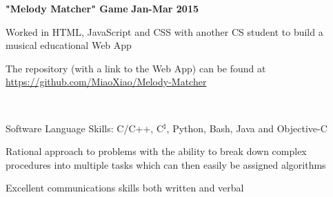 \documentclass[10pt]{article}
\newcommand{\thing}[1][]{\item #1}
\newcommand{\sectionheader}[1]{
    \vspace{3pt}
    \StrSplit{#1}{3}{\firstpart}{\lastpart} %
    \textbf{\LARGE
        \firstpart
        \lastpart
    }\\[5pt]
}
\newcommand{\dates}[2]{
    \textbf{#1-#2}
}
\begin{document}
    \textbf{\large "Melody Matcher" Game} \hfill \dates{Jan}{Mar 2015}
    \begin{things}
        \thing Worked in HTML, JavaScript and CSS with another
                CS student to build a musical educational Web App
        \thing The repository (with a link to the Web App) can be
                found at \url{https://github.com/MiaoXiao/Melody-Matcher}
    \end{things}

    \sectionheader{Skills}
    \vspace{-15pt} %
    \begin{things}
        \thing Software Language Skills: C/C++, C$^\sharp$, Python, Bash,
                Java and Objective-C
        \thing Rational approach to problems with the ability to
                break down complex procedures into multiple tasks
                which can then easily be assigned algorithms
        \thing Excellent communications skills both written and verbal
    \end{things}
\end{document}
